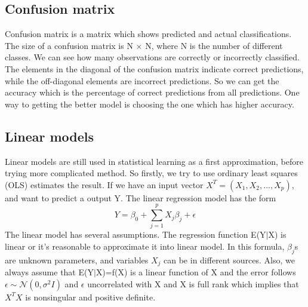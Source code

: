 \documentclass[12pt]{article}
\begin{document}
\subsection{Confusion matrix}
Confusion matrix is a matrix which shows predicted and actual classifications. The size of a confusion matrix is N $\times$ N, where N is the number of different classes. \cite{kohavi1998glossary, altman1994diagnostic} We can see how many observations are correctly or incorrectly classified. The elements in the diagonal of the confusion matrix indicate correct predictions, while the off-diagonal elements are incorrect predictions. So we can get the accuracy which is the percentage of correct predictions from all predictions. One way to getting the better model is choosing the one which has higher accuracy. \cite{james2013introduction}

\subsection{Linear models}  
Linear models are still used in statistical learning as a first approximation, before trying more complicated method. So firstly, we try to use ordinary least squares (OLS) estimates the result. If we have an input vector $X^T=(X_1,X_2,...,X_p)$, and want to predict a output Y. The linear regression model has the form $$Y=\beta_0+\sum_{j=1}^{p} X_j\beta_j + \epsilon$$
The linear model has several assumptions. The regression function E(Y$\mid$X) is linear or it's reasonable to approximate it into linear model. In this formula, $\beta_j$s are unknown parameters, and variables $X_j$ can be in different sources. 
Also, we always assume that E(Y$\mid$X)=f(X) is a linear function of X and the error follows $\epsilon \sim \mathcal N(0, \sigma^2I)$ and $\epsilon$ uncorrelated with X and X is full rank which implies that $X^TX$ is nonsingular and positive definite. \cite[p.44-49]{friedman2001elements} 
\end{document}
